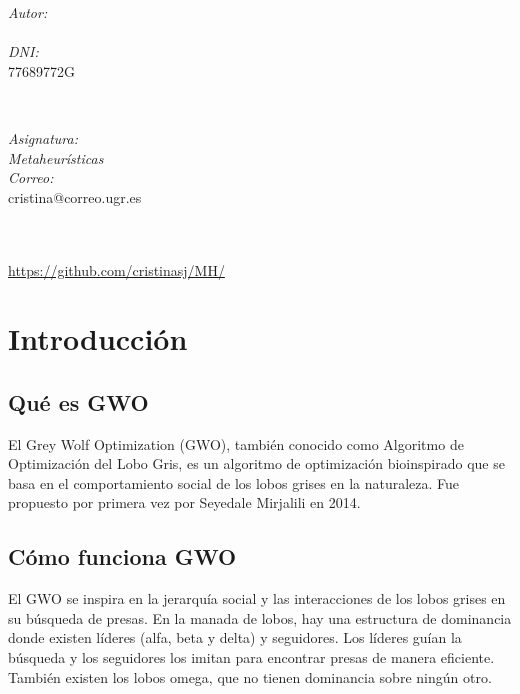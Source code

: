 \documentclass[12pt, spanish]{article}
\makeatletter
\let\theauthor\@author
\let\thedate\@date
\makeatother
\begin{document}
\begin{titlepage}
    \begin{minipage}{0.4\textwidth}
        \begin{flushleft} \large
            \emph{Autor:}\\
            \theauthor\\ 
			 \emph{DNI:}\\
            77689772G
            \end{flushleft}
            \end{minipage}~
            \begin{minipage}{0.4\textwidth}
            \begin{flushright} \large
            \emph{Asignatura: \\
            Metaheurísticas}   \\     
            \emph{Correo:}\\
            cristina@correo.ugr.es           
        \end{flushright}
    \end{minipage}\\[0.5cm]
  
    {\large \thedate}\\[0.5cm]
    {\url{https://github.com/cristinasj/MH/}}
 	
    \vfill
    
\end{titlepage}


\tableofcontents
\pagebreak



\section{Introducción}
\subsection{Qué es GWO}
El Grey Wolf Optimization (GWO), también conocido como Algoritmo de Optimización del Lobo 
Gris, es un algoritmo de optimización bioinspirado que se basa en el comportamiento 
social de los lobos grises en la naturaleza. Fue propuesto por primera vez por Seyedale 
Mirjalili en 2014.

\subsection{Cómo funciona GWO}
El GWO se inspira en la jerarquía social y las interacciones de los lobos grises en su 
búsqueda de presas. En la manada de lobos, hay una estructura de dominancia donde existen 
líderes (alfa, beta y delta) y seguidores. Los líderes guían la búsqueda y los seguidores 
los imitan para encontrar presas de manera eficiente.
\newline 
También existen los lobos omega, que no tienen dominancia sobre ningún otro. 
\end{document}
